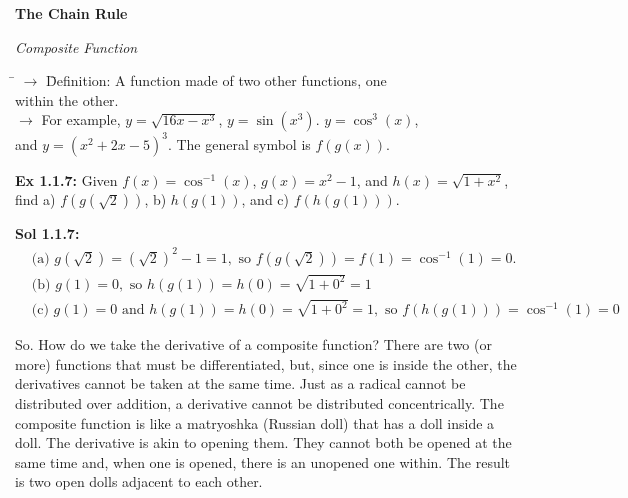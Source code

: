\bigskip

\textbf{\large{The Chain Rule}} \par

\begin{tcolorbox}[definition]
    \begin{tabbing}
        \hypertarget{Composite Function}{\textit{Composite Function}} \= $\rightarrow$ \= Definition: A function made of two other functions, one \\
        \> \> within the other. \\[5.5pt]
        \> $\rightarrow$ \> For example, $y = \sqrt{16x - x^3}$, $y = \sin \left(x^3\right)$. $y = \cos^3 (x)$, \\
        \> \> and $y = \left(x^2 + 2x - 5\right)^3$. The general symbol is $f(g(x))$. 
    \end{tabbing}
\end{tcolorbox} \vspace{11pt}

\begin{tcolorbox}[example]
    \textbf{Ex 1.1.7: } Given $f(x) = \cos^{-1} (x)$, $g(x) = x^2 - 1$, and $h(x) = \sqrt{1 + x^2}$, find a) $f\left(g\left(\sqrt{2}\right)\right)$, b) $h(g(1))$, and c) $f(h(g(1)))$. 
\end{tcolorbox}
\begin{tcolorbox}[solution]
    \textbf{Sol 1.1.7: } \begin{align*}
        &\text{(a) } g\left(\sqrt{2}\right) = \left(\sqrt{2}\right)^2 - 1 = 1, \text{ so } f\left(g\left(\sqrt{2}\right)\right) = f(1) = \cos^{-1}(1) = \boxed{0}. \\[11pt]
        &\text{(b) } g(1) = 0, \text{ so } h(g(1)) = h(0) = \sqrt{1 + 0^2} = \boxed{1} \\[11pt]
        &\text{(c) } g(1) = 0 \text{ and } h(g(1)) = h(0) = \sqrt{1 + 0^2} = 1, \text{ so } f(h(g(1))) = \cos^{-1}(1) = \boxed{0}
    \end{align*}
\end{tcolorbox}

So. How do we take the derivative of a composite function? There are two (or more) functions that must be differentiated, but, since one is inside the other, the derivatives cannot be taken at the same time. Just as a radical cannot be distributed over addition, a derivative cannot be distributed concentrically. The composite function is like a matryoshka (Russian doll) that has a doll inside a doll. The derivative is akin to opening them. They cannot both be opened at the same time and, when one is opened, there is an unopened one within. The result is two open dolls adjacent to each other. 

